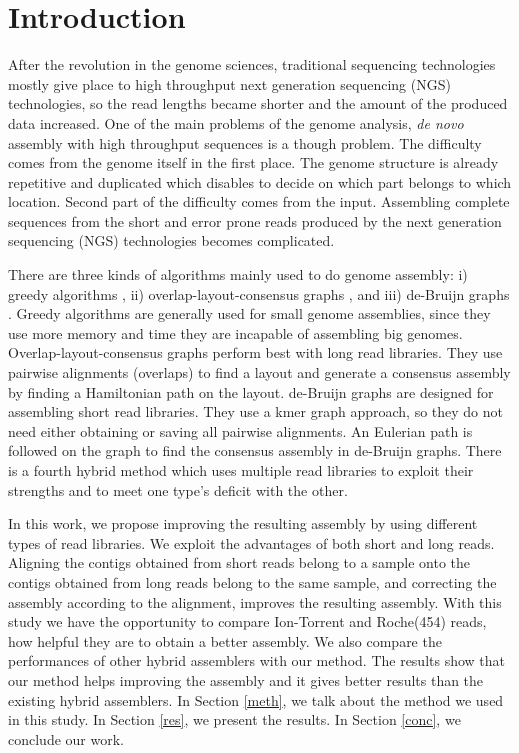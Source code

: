 \documentclass{bioinfo}
\begin{document}
\section{Introduction}

After the revolution in the genome sciences, traditional sequencing technologies mostly give place to high throughput next generation sequencing (NGS) technologies, so the read lengths became shorter and the amount of the produced data increased. One of the main problems of the genome analysis, \textit{de novo} assembly with high throughput sequences is a though problem. The difficulty comes from the genome itself in the first place. The genome structure is already repetitive and duplicated which disables to decide on which part belongs to which location. Second part of the difficulty comes from the input. Assembling complete sequences from the short and error prone reads produced by the next generation sequencing (NGS) technologies becomes complicated.

There are three kinds of algorithms mainly used to do genome assembly: i) greedy algorithms \cite{ssake:2007,sharcgs:2007,vcake:2007}, ii) overlap-layout-consensus graphs \cite{celera:2000, sga:2012, hapsemblerDonmez:2011}, and iii) de-Bruijn graphs \cite{eulerPevzner:2008, zerbino:2009, abyssSimpson:2009, allpaths:2008, soapdenovo:2009}. Greedy algorithms are generally used for small genome assemblies, since they use more memory and time they are incapable of assembling big genomes. Overlap-layout-consensus graphs perform best with long read libraries. They use pairwise alignments (overlaps) to find a layout and generate a consensus assembly by finding a Hamiltonian path on the layout. de-Bruijn graphs are designed for assembling short read libraries. They use a kmer graph approach, so they do not need either obtaining or saving all pairwise alignments. An Eulerian path is followed on the graph to find the consensus assembly in de-Bruijn graphs. There is a fourth hybrid method which uses multiple read libraries to exploit their strengths and to meet one type's deficit with the other.

In this work, we propose improving the resulting assembly by using different types of read libraries. We exploit the advantages of both short and long reads. Aligning the contigs obtained from short reads belong to a sample onto the contigs obtained from long reads belong to the same sample, and correcting the assembly according to the alignment, improves the resulting assembly. With this study we have the opportunity to compare Ion-Torrent and Roche(454) reads, how helpful they are to obtain a better assembly. We also compare the performances of other hybrid assemblers with our method. The results show that our method helps improving the assembly and it gives better results than the existing hybrid assemblers. In Section \ref{meth}, we talk about the method we used in this study. In Section \ref{res}, we present the results. In Section \ref{conc}, we conclude our work.
\end{document}
